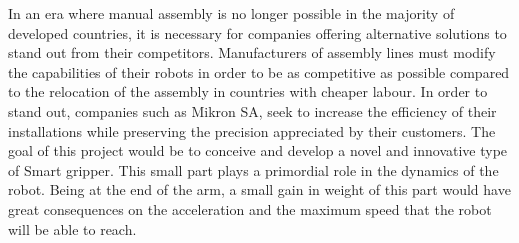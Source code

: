 %
%
In an era where manual assembly is no longer possible in the majority of developed countries, it is necessary for companies offering alternative solutions to stand out from their competitors. Manufacturers of assembly lines must modify the capabilities of their robots in order to be as competitive as possible compared to the relocation of the assembly in countries with cheaper labour. In order to stand out, companies such as Mikron SA, seek to increase the efficiency of their installations while preserving the precision appreciated by their customers. The goal of this project would be to conceive and develop a novel and innovative type of Smart gripper. This small part plays a primordial role in the dynamics of the robot. Being at the end of the arm, a small gain in weight of this part would have great consequences on the acceleration and the maximum speed that the robot will be able to reach.

